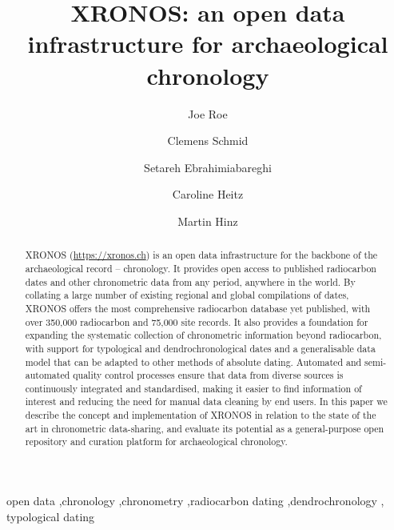 \documentclass[
  number,
  review]{elsarticle}
\begin{document}
\begin{frontmatter}
\title{XRONOS: an open data infrastructure for archaeological
chronology}
\author[1]{Joe Roe%
%
}
\author[2]{Clemens Schmid%
%
}

\author[1]{Setareh Ebrahimiabareghi%
%
}

\author[1]{Caroline Heitz%
%
}

\author[1]{Martin Hinz%
%
}







        
\begin{abstract}
XRONOS (\url{https://xronos.ch}) is an open data infrastructure for the
backbone of the archaeological record -- chronology. It provides open
access to published radiocarbon dates and other chronometric data from
any period, anywhere in the world. By collating a large number of
existing regional and global compilations of dates, XRONOS offers the
most comprehensive radiocarbon database yet published, with over 350,000
radiocarbon and 75,000 site records. It also provides a foundation for
expanding the systematic collection of chronometric information beyond
radiocarbon, with support for typological and dendrochronological dates
and a generalisable data model that can be adapted to other methods of
absolute dating. Automated and semi-automated quality control processes
ensure that data from diverse sources is continuously integrated and
standardised, making it easier to find information of interest and
reducing the need for manual data cleaning by end users. In this paper
we describe the concept and implementation of XRONOS in relation to the
state of the art in chronometric data-sharing, and evaluate its
potential as a general-purpose open repository and curation platform for
archaeological chronology.
\end{abstract}





\begin{keyword}
    open data \sep chronology \sep chronometry \sep radiocarbon
dating \sep dendrochronology \sep 
    typological dating
\end{keyword}
\end{frontmatter}
    
\end{document}
